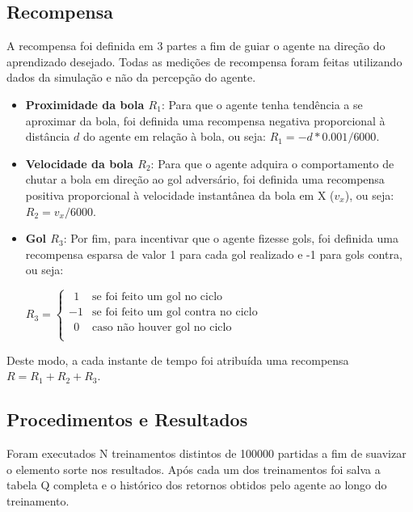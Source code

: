 \subsection{Recompensa}

A recompensa foi definida em 3 partes a fim de guiar o agente na direção do aprendizado desejado. Todas as medições de recompensa foram feitas utilizando dados da simulação e não da percepção do agente.

\begin{itemize}
    \item \textbf{Proximidade da bola $R_1$}: Para que o agente tenha tendência a se aproximar da bola, foi definida uma recompensa negativa proporcional à distância $d$ do agente em relação à bola, ou seja: $R_1 = -d*0.001/6000$.

    \item \textbf{Velocidade da bola $R_2$}: Para que o agente adquira o comportamento de chutar a bola em direção ao gol adversário, foi definida uma recompensa positiva proporcional à velocidade instantânea da bola em X ($v_x$), ou seja: $R_2 = v_x/6000$.
    
    \item \textbf{Gol $R_3$}: Por fim, para incentivar que o agente fizesse gols, foi definida uma recompensa esparsa de valor 1 para cada gol realizado e -1 para gols contra, ou seja:
    
    $
    R_3 =
    \left\{
        \begin{array}{ll}
        \ \ 1  & \mbox{se foi feito um gol no ciclo} \\
         -1  & \mbox{se foi feito um gol contra no ciclo} \\
        \ \ 0  & \mbox{caso não houver gol no ciclo} \\
        \end{array}
    \right.
    $
\end{itemize}

Deste modo, a cada instante de tempo foi atribuída uma recompensa $R = R_1 + R_2 + R_3$.

\subsection{Procedimentos e Resultados}

Foram executados N treinamentos distintos de 100000 partidas a fim de suavizar o elemento sorte nos resultados. Após cada um dos treinamentos foi salva a tabela Q completa e o histórico dos retornos obtidos pelo agente ao longo do treinamento.

